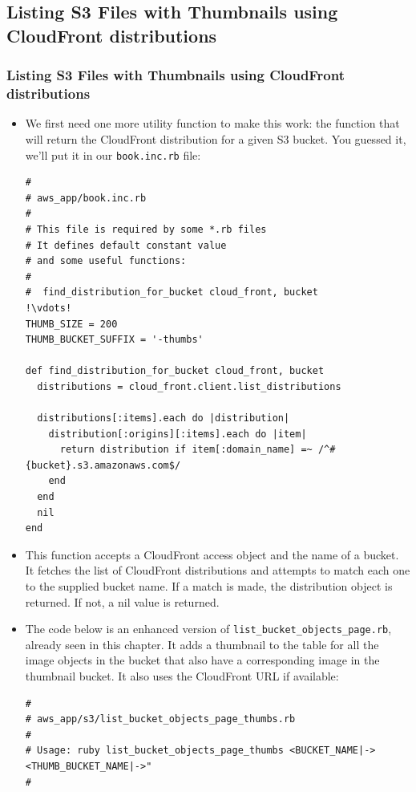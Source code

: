 \documentclass{beamer}
\begin{document}
\subsection{Listing S3 Files with Thumbnails using CloudFront distributions}
\begin{frame}
\frametitle{Listing S3 Files with Thumbnails using CloudFront distributions}
\begin{itemize}
\item We first need one more utility function
to make this work: the function that will return the
CloudFront distribution for a given S3 bucket. You guessed it, we’ll put it in
our \texttt{book.inc.rb} file:

\lstset{language=Ruby, style=eclipse}
\begin{lstlisting}[escapechar=!]
#
# aws_app/book.inc.rb
#
# This file is required by some *.rb files
# It defines default constant value
# and some useful functions:
#
#  find_distribution_for_bucket cloud_front, bucket
!\vdots!
THUMB_SIZE = 200
THUMB_BUCKET_SUFFIX = '-thumbs'

def find_distribution_for_bucket cloud_front, bucket
  distributions = cloud_front.client.list_distributions

  distributions[:items].each do |distribution|
    distribution[:origins][:items].each do |item|
      return distribution if item[:domain_name] =~ /^#{bucket}.s3.amazonaws.com$/
    end
  end
  nil
end
\end{lstlisting}

\item This function accepts a CloudFront access object and the name of a bucket. It fetches
the list of CloudFront distributions and attempts to match each one to the supplied
bucket name. If a match is made, the distribution object is returned. If not, a nil value is returned.

\item The code below is an enhanced version of \texttt{list\_bucket\_objects\_page.rb}, already seen
in this chapter. It adds a thumbnail to the table for all the image objects in
the bucket that also have a corresponding image in the thumbnail bucket. It also
uses the CloudFront URL if available:

\lstset{language=Ruby, style=eclipse}
\begin{lstlisting}[escapechar=!]
#
# aws_app/s3/list_bucket_objects_page_thumbs.rb
#
# Usage: ruby list_bucket_objects_page_thumbs <BUCKET_NAME|-> <THUMB_BUCKET_NAME|->"
#


\end{lstlisting}
\end{itemize}
\end{frame}
\end{document}
